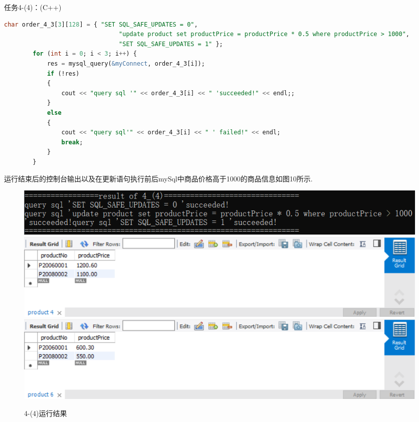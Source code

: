 \documentclass[a4paper,UTF8]{article}
\theoremstyle{definition}
\begin{document}
\begin{CJK}{UTF8}{gkai}
{\heiti \large 任务4-(4)：(C++)}
\begin{lstlisting}[language=SQL]
char order_4_3[3][128] = { "SET SQL_SAFE_UPDATES = 0",
                                "update product set productPrice = productPrice * 0.5 where productPrice > 1000",
                                "SET SQL_SAFE_UPDATES = 1" };
        for (int i = 0; i < 3; i++) {
            res = mysql_query(&myConnect, order_4_3[i]);
            if (!res)
            {
                cout << "query sql '" << order_4_3[i] << " 'succeeded!" << endl;;
            }
            else
            {
                cout << "query sql'" << order_4_3[i] << " ' failed!" << endl;
                break;
            }
        }
\end{lstlisting}
\par 运行结束后的控制台输出以及在更新语句执行前后mySql中商品价格高于1000的商品信息如图10所示.
\begin{figure}[h]
\centering
\includegraphics[scale=0.7]{./img/4-4-1.png}
\includegraphics[scale=0.6]{./img/4-4-2.png}
\includegraphics[scale=0.6]{./img/4-4-3.png}
\caption{4-(4)运行结果}
\label{fig:label}
\end{figure}


\end{CJK}
\end{document}

